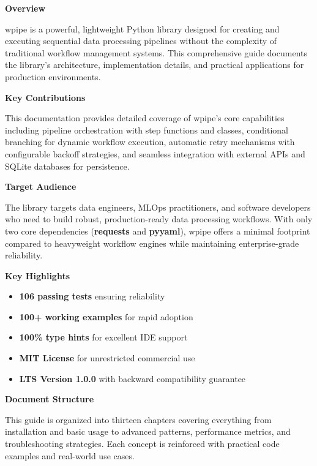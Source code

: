 \documentclass[12pt,a4paper]{report}
\newcommand{\pkg}[1]{\textbf{#1}}
\begin{document}
{\sffamily
\textbf{Overview}

wpipe is a powerful, lightweight Python library designed for creating and executing sequential data processing pipelines without the complexity of traditional workflow management systems. This comprehensive guide documents the library's architecture, implementation details, and practical applications for production environments.

\textbf{Key Contributions}

This documentation provides detailed coverage of wpipe's core capabilities including pipeline orchestration with step functions and classes, conditional branching for dynamic workflow execution, automatic retry mechanisms with configurable backoff strategies, and seamless integration with external APIs and SQLite databases for persistence.

\textbf{Target Audience}

The library targets data engineers, MLOps practitioners, and software developers who need to build robust, production-ready data processing workflows. With only two core dependencies (\pkg{requests} and \pkg{pyyaml}), wpipe offers a minimal footprint compared to heavyweight workflow engines while maintaining enterprise-grade reliability.

\textbf{Key Highlights}

\begin{itemize}
    \item \textbf{106 passing tests} ensuring reliability
    \item \textbf{100+ working examples} for rapid adoption
    \item \textbf{100\% type hints} for excellent IDE support
    \item \textbf{MIT License} for unrestricted commercial use
    \item \textbf{LTS Version 1.0.0} with backward compatibility guarantee
\end{itemize}

\textbf{Document Structure}

This guide is organized into thirteen chapters covering everything from installation and basic usage to advanced patterns, performance metrics, and troubleshooting strategies. Each concept is reinforced with practical code examples and real-world use cases.
}

\tableofcontents
\cleardoublepage
\end{document}
